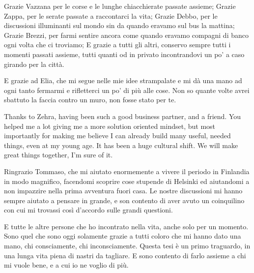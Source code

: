 Grazie Vazzana per le corse e le lunghe chiacchierate passate assieme; Grazie Zappa, per le serate passate a raccontarci la vita; Grazie Debbo, per le discussioni illuminanti sul mondo sin da quando eravamo sul bus la mattina; Grazie Brezzi, per farmi sentire ancora come quando eravamo compagni di banco ogni volta che ci troviamo; E grazie a tutti gli altri, conservo sempre tutti i momenti passati assieme, tutti quanti od in privato incontrandovi un po' a caso girando per la città.

E grazie ad Elia, che mi segue nelle mie idee strampalate e mi dà una mano ad ogni tanto fermarmi e rifletterci un po' di più alle cose. Non so quante volte avrei sbattuto la faccia contro un muro, non fosse stato per te.

Thanks to Zehra, having been such a good business partner, and a friend. You helped me a lot giving me a more solution oriented mindset, but most importantly for making me believe I can already build many useful, needed things, even at my young age. It has been a huge cultural shift. We will make great things together, I'm sure of it.

Ringrazio Tommaso, che mi aiutato enormemente a vivere il periodo in Finlandia in modo magnifico, facendomi scoprire cose stupende di Helsinki ed aiutandomi a non impazzire nella prima avventura fuori casa. Le nostre discussioni mi hanno sempre aiutato a pensare in grande, e son contento di aver avuto un coinquilino con cui mi trovassi così d'accordo sulle grandi questioni.

E tutte le altre persone che ho incontrato nella vita, anche solo per un momento. Sono quel che sono oggi solamente grazie a tutti coloro che mi hanno dato una mano, chi consciamente, chi inconsciamente. Questa tesi è un primo traguardo, in una lunga vita piena di nastri da tagliare. E sono contento di farlo assieme a chi mi vuole bene, e a cui io ne voglio di più.

